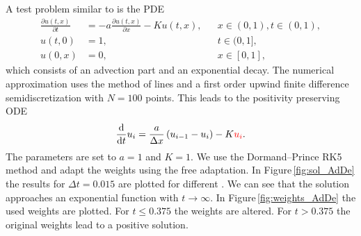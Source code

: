 \documentclass[a4paper]{article}
\numberwithin{equation}{section}
\theoremstyle{plain}
\theoremstyle{definition}
\numberwithin{theorem}{section}
\newcommand{\1}{\mathbbm{1}}
\newcommand{\revA}[1]{{\color{red}#1}}
\begin{document}
A test problem similar to \cite{shampine_non-negative_2005} is the PDE
\begin{equation}
\label{eq:advection-decay}
\begin{aligned}
  \frac{\partial u(t,x)}{\partial t}
  &=
  -a \frac{\partial u(t,x)}{\partial x} - K u(t,x),
  && x \in (0, 1), t \in (0,1),
  \\
  u(t,0) &= 1,
  && t \in (0,1],
  \\
  u(0,x) &= 0,
  && x \in [0,1],
\end{aligned}
\end{equation}
which consists of an advection part and an exponential decay.
The numerical approximation uses the method of lines and a first order
upwind finite difference semidiscretization with $N = 100$ points.
This leads to the positivity preserving ODE
\begin{equation}
\label{eq:advection-decay-semidiscrete}
\frac{\mathrm d}{\mathrm d t} u_i = \frac{a}{\Delta x} \left( u_{i-1} - u_i \right) - K \revA{u_{i}}.
\end{equation}
The parameters are set to $a=1$ and $K=1$.
We use the Dormand--Prince RK5 method and adapt the weights using the free adaptation.
In Figure\,\ref{fig:sol_AdDe} the results for $\Delta t = 0.015$ are plotted for different \linelabel{line:time-vs-dt}\revA{of time $t$}. We can see that the solution approaches an exponential function with $t \rightarrow \infty$.
In Figure\,\ref{fig:weights_AdDe} the used weights are plotted. For $t\leq 0.375$ the weights are altered. For $t > 0.375$ the original weights lead to a positive solution.
\end{document}
